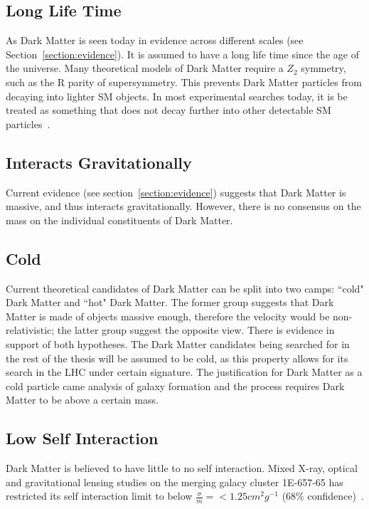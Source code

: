 \subsection{Long Life Time}
As Dark Matter is seen today in evidence across different scales (see Section~\ref{section:evidence}). It is assumed to have a long life time since the age of the universe. Many theoretical models of Dark Matter require a $Z_{2}$ symmetry, such as the R parity of supersymmetry. This prevents Dark Matter particles from decaying into lighter SM objects. In most experimental searches today, it is be treated as something that does not decay further into other detectable SM
particles~\cite{boveia2018dark}.

\subsection{Interacts Gravitationally}
Current evidence (see section~\ref{section:evidence}) suggests that Dark Matter is massive, and thus interacts gravitationally. However, there is no consensus on the mass on the individual constituents of Dark Matter. 

\subsection{Cold}
Current theoretical candidates of Dark Matter can be split into two camps: ``cold" Dark Matter and ``hot" Dark Matter. The former group suggests that Dark Matter is made of objects massive enough, therefore the velocity would be non-relativistic; the latter group suggest the opposite view. There is evidence in support of both hypotheses. The Dark Matter candidates being searched for in the rest of the thesis will be assumed to be cold, as this property allows for its search in the LHC under certain signature. The justification for Dark Matter as a cold particle came analysis of galaxy formation and the process requires Dark Matter to be above a certain mass. 

\subsection{Low Self Interaction}
Dark Matter is believed to have little to no self interaction. Mixed X-ray, optical and gravitational lensing studies on the merging galacy cluster 1E-657-65 has restricted its self interaction limit to below $\frac{\sigma}{m}= < 1.25 cm^{2} g^{-1}$ (68\% confidence)~\cite{randall2008constraints}. 
 

